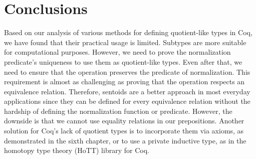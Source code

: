 \section{Conclusions}
Based on our analysis of various methods for defining quotient-like types in Coq, we have found that their practical usage is limited. Subtypes are more suitable for computational purposes. However, we need to prove the normalization predicate's uniqueness to use them as quotient-like types. Even after that, we need to ensure that the operation preserves the predicate of normalization. This requirement is almost as challenging as proving that the operation respects an equivalence relation. Therefore, sentoids are a better approach in most everyday applications since they can be defined for every equivalence relation without the hardship of defining the normalization function or predicate. However, the downside is that we cannot use equality relations in our prepositions. Another solution for Coq's lack of quotient types is to incorporate them via axioms, as demonstrated in the sixth chapter, or to use a private inductive type, as in the homotopy type theory (HoTT) library for Coq.